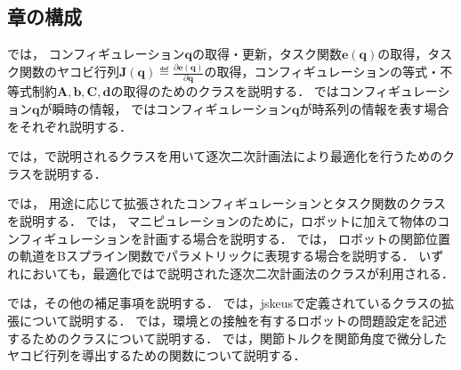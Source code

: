 \subsection{章の構成}

では，
コンフィギュレーション$\bm{q}$の取得・更新，タスク関数$\bm{e}(\bm{q})$の取得，タスク関数のヤコビ行列$\bm{J}(\bm{q}) \eqdef \frac{\partial \bm{e}(\bm{q})}{\partial \bm{q}}$の取得，コンフィギュレーションの等式・不等式制約$\bm{A}, \bm{b}, \bm{C}, \bm{d}$の取得のためのクラスを説明する．
ではコンフィギュレーション$\bm{q}$が瞬時の情報，
ではコンフィギュレーション$\bm{q}$が時系列の情報を表す場合をそれぞれ説明する．

では，で説明されるクラスを用いて逐次二次計画法により最適化を行うためのクラスを説明する．

では，
用途に応じて拡張されたコンフィギュレーションとタスク関数のクラスを説明する．
では，
マニピュレーションのために，ロボットに加えて物体のコンフィギュレーションを計画する場合を説明する．
では，
ロボットの関節位置の軌道をBスプライン関数でパラメトリックに表現する場合を説明する．
いずれにおいても，最適化ではで説明された逐次二次計画法のクラスが利用される．

では，その他の補足事項を説明する．
では，jskeusで定義されているクラスの拡張について説明する．
では，環境との接触を有するロボットの問題設定を記述するためのクラスについて説明する．
では，関節トルクを関節角度で微分したヤコビ行列を導出するための関数について説明する．
